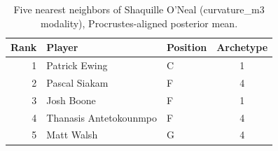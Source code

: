 \begin{table}[htbp]
  \centering\small
  \begin{tabular}{rllc}
    \toprule
    Rank & Player & Position & Archetype \\
    \midrule
    1 & Patrick Ewing & C & 1 \\
    2 & Pascal Siakam & F & 4 \\
    3 & Josh Boone & F & 1 \\
    4 & Thanasis Antetokounmpo & F & 4 \\
    5 & Matt Walsh & G & 4 \\
    \bottomrule
  \end{tabular}
  \caption{Five nearest neighbors of Shaquille O'Neal (curvature_m3 modality), Procrustes-aligned posterior mean.}
  \label{tab:Shaquille_O_Neal_neighbors_curvature_m3}
\end{table}

